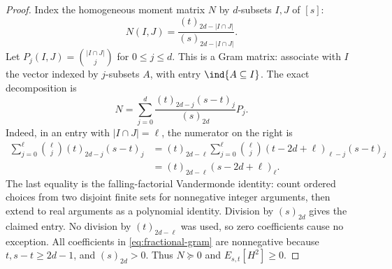 \begin{proof}
Index the homogeneous moment matrix $N$ by $d$-subsets $I,J$ of $[s]$:
\[
 N(I,J)=\frac{(t)_{2d-|I\cap J|}}{(s)_{2d-|I\cap J|}}.
\]
Let $P_j(I,J)=\binom{|I\cap J|}{j}$ for $0\le j\le d$.
This is a Gram matrix: associate with $I$ the vector indexed by
$j$-subsets $A$, with entry $\ind\{A\subseteq I\}$.
The exact decomposition is
\begin{equation}\label{eq:fractional-gram}
 N=\sum_{j=0}^d
   \frac{(t)_{2d-j}(s-t)_j}{(s)_{2d}}P_j.
\end{equation}
Indeed, in an entry with $|I\cap J|=\ell$, the numerator on the right
is
\begin{align*}
 \sum_{j=0}^\ell\binom\ell j(t)_{2d-j}(s-t)_j
 &=(t)_{2d-\ell}
   \sum_{j=0}^\ell\binom\ell j
       (t-2d+\ell)_{\ell-j}(s-t)_j\\
 &=(t)_{2d-\ell}(s-2d+\ell)_\ell.
\end{align*}
The last equality is the falling-factorial Vandermonde identity: count
ordered choices from two disjoint finite sets for nonnegative integer
arguments, then extend to real arguments as a polynomial identity.
Division by $(s)_{2d}$ gives the claimed entry. No division by
$(t)_{2d-\ell}$ was used, so zero coefficients cause no exception.
All coefficients in \eqref{eq:fractional-gram} are nonnegative because
$t,s-t\ge2d-1$, and $(s)_{2d}>0$. Thus $N\succeq0$ and
$E_{s,t}[H^2]\ge0$.
\end{proof}

